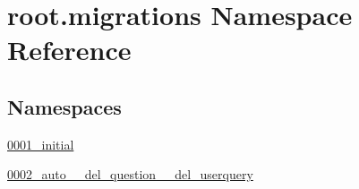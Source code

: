 \hypertarget{namespaceroot_1_1migrations}{\section{root.\-migrations Namespace Reference}
\label{namespaceroot_1_1migrations}
}
\subsection*{Namespaces}
\begin{DoxyCompactItemize}
\item 
\hyperlink{namespaceroot_1_1migrations_1_10001__initial}{0001\-\_\-initial}
\item 
\hyperlink{namespaceroot_1_1migrations_1_10002__auto____del__question____del__userquery}{0002\-\_\-auto\-\_\-\-\_\-del\-\_\-question\-\_\-\-\_\-del\-\_\-userquery}
\end{DoxyCompactItemize}
